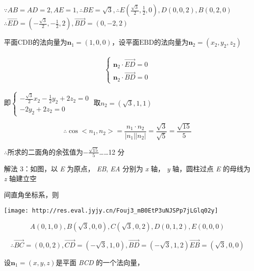 \documentclass{scrbook}
\begin{document}
$\because AB=AD=2,AE=1,\therefore BE=\sqrt{3},\therefore E\left(\frac{\sqrt{3}}{2},\frac{1}{2},0\right),D(0,0,2),B(0,2,0)$$\therefore \overset{\rightarrow }{ED}=\left(- \frac{\sqrt{3}}{2},- \frac{1}{2},2\right),\overset{\rightarrow }{BD}=(0,- 2,2)$

平面$\mathrm{CDB}$的法向量为$\mathbf{n}_{1}=(1,0,0)$，设平面$\mathrm{EBD}$的法向量为$\mathbf{n}_{2}=\left(x_{2},y_{2},z_{2}\right)$

\begin{align*}
\left\{\begin{array}{l}
\mathbf{n}_{2}\cdot \overset{\rightarrow }{ED}=0\\
\mathbf{n}_{2}\cdot \overset{\rightarrow }{BD}=0
\end{array}\right.
\end{align*}

即$\left\{\begin{array}{l}
- \frac{\sqrt{3}}{2}x_{2}- \frac{1}{2}y_{2}+2z_{2}=0\\
- 2y_{2}+2z_{2}=0
\end{array}\right.$ 取$n_{2}=(\sqrt{3},1,1)$

\begin{equation*}
\therefore \cos <n_{1},n_{2}>=\frac{n_{1}\cdot n_{2}}{\left|n_{1}\right|\left|n_{2}\right|}=\frac{\sqrt{3}}{\sqrt{5}}=\frac{\sqrt{15}}{5}
\end{equation*}

${\therefore}$所求的二面角的余弦值为$- \frac{\sqrt{15}}{5}${\ldots}{\ldots}12 分

解法 3：如图，以 \textit{E} 为原点， \textit{EB}, \textit{EA} 分别为 \textit{x} 轴， \textit{y} 轴，圆柱过点 \textit{E} 的母线为 \textit{z} 轴建立空

间直角坐标系，则

\texttt{[image: http://res.eval.jyjy.cn/Fouj3\_mB0EtP3uNJSPp7jLGlq02y]}

\begin{equation*}
A(0,1,0),B(\sqrt{3},0,0),C(\sqrt{3},0,2),D(0,1,2),E(0,0,0)
\end{equation*}

\begin{equation*}
\therefore \overset{\rightarrow }{BC}=(0,0,2),\overset{\rightarrow }{CD}=(- \sqrt{3},1,0),\overset{\rightarrow }{BD}=(- \sqrt{3},1,2)\overset{\rightarrow }{EB}=(\sqrt{3},0,0)
\end{equation*}

设$\mathbf{n}_{1}=(x,y,z)$是平面 \textit{BCD} 的一个法向量，
\end{document}
